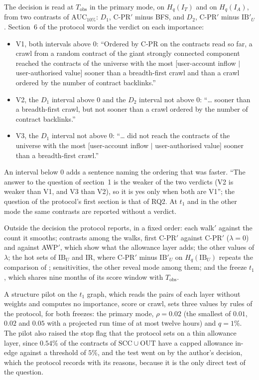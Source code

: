 The decision is read at $T_{\mathrm{obs}}$ in the primary mode, on $H_q(I_T)$ and on $H_q(I_A)$, from two contrasts of $\mathrm{AUC}_{10\%}$: $D_1$, \mbox{C-PR}$'$ minus BFS, and $D_2$, \mbox{C-PR}$'$ minus $\mathrm{IB}'_U$. Section~6 of the protocol words the verdict on each importance:
\begin{itemize}
\item V1, both intervals above $0$: ``Ordered by \mbox{C-PR} on the contracts read so far, a crawl from a random contract of the giant strongly connected component reached the contracts of the universe with the most [user-account inflow $\mid$ user-authorised value] sooner than a breadth-first crawl and than a crawl ordered by the number of contract backlinks.''
\item V2, the $D_1$ interval above $0$ and the $D_2$ interval not above $0$: ``\ldots{} sooner than a breadth-first crawl, but not sooner than a crawl ordered by the number of contract backlinks.''
\item V3, the $D_1$ interval not above $0$: ``\ldots{} did not reach the contracts of the universe with the most [user-account inflow $\mid$ user-authorised value] sooner than a breadth-first crawl.''
\end{itemize}
An interval below $0$ adds a sentence naming the ordering that was faster. ``The answer to the question of section~1 is the weaker of the two verdicts (V2 is weaker than V1, and V3 than V2), so it is yes only when both are V1''; the question of the protocol's first section is that of RQ2. At $t_1$ and in the other mode the same contrasts are reported without a verdict.

Outside the decision the protocol reports, in a fixed order: each walk$'$ against the count it smooths; contrasts among the walks, first \mbox{C-PR}$'$ against \mbox{C-PR}$'$ ($\lambda=0$) and against AWP$'$, which show what the allowance layer adds; the other values of $\lambda$; the hot sets of $\mathrm{IB}_U$ and $\mathrm{IR}$, where \mbox{C-PR}$'$ minus $\mathrm{IB}'_U$ on $H_q(\mathrm{IB}_U)$ repeats the comparison of \textcite{cho1998crawling}; sensitivities, the other reveal mode among them; and the freeze $t_1$, which shares nine months of its score window with $T_{\mathrm{obs}}$.

A structure pilot on the $t_1$ graph, which reads the pairs of each layer without weights and computes no importance, score or crawl, sets three values by rules of the protocol, for both freezes: the primary mode, $\rho=0.02$ (the smallest of $0.01$, $0.02$ and $0.05$ with a projected run time of at most twelve hours) and $q=1\%$. The pilot also raised the stop flag that the protocol sets on a thin allowance layer, since $0.54\%$ of the contracts of $\mathrm{SCC}\cup\mathrm{OUT}$ have a capped allowance in-edge against a threshold of $5\%$, and the test went on by the author's decision, which the protocol records with its reasons, because it is the only direct test of the question.

